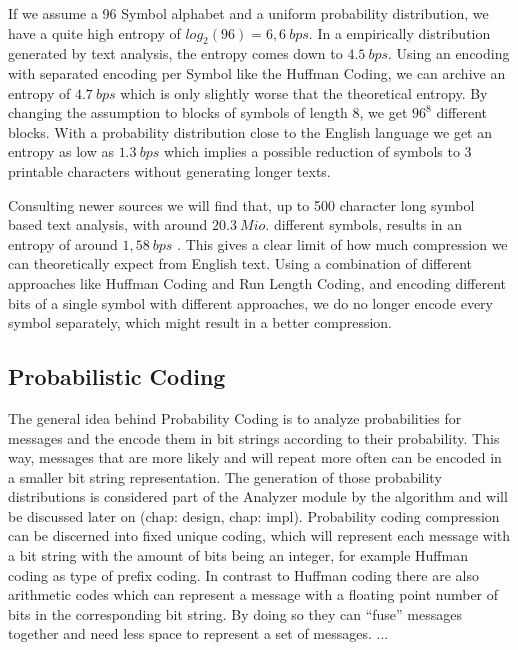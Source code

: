 \par {
If we assume a 96 Symbol alphabet and a uniform probability distribution, we have a quite high entropy of $log_2 (96) = 6,6 \: bps$. In a empirically distribution generated by text analysis, the entropy comes down to $4.5 \: bps$. Using an encoding with separated encoding per Symbol like the Huffman Coding, we can archive an entropy of $4.7 \: bps$ which is only slightly worse that the theoretical entropy. By changing the assumption to blocks of symbols of length 8, we get $96^8$ different blocks. With a probability distribution close to the English language we get an entropy as low as $1.3 \: bps$ which implies a possible reduction of symbols to 3 printable characters without generating longer texts.}

\par{
Consulting newer sources we will find that, up to 500 character long symbol based text analysis, with around $20.3 \: Mio.$ different symbols, results in an entropy of around $1,58 \: bps$ \cite{entropy-new}. This gives a clear limit of how much compression we can theoretically expect from English text.  Using a combination of different approaches like Huffman Coding and Run Length Coding, and encoding different bits of a single symbol with different approaches, we do no longer encode every symbol separately, which might result in a better compression.}


\subsection{Probabilistic Coding}
\par{
The general idea behind Probability Coding is to analyze probabilities for messages and the encode them in bit strings according to their probability. This way, messages that are more likely and will repeat more often can be encoded in a smaller bit string representation. The generation of those probability distributions is considered part of the Analyzer module by the algorithm and will be discussed later on (chap: design, chap: impl). Probability coding compression can be discerned into fixed unique coding, which will represent each message with a bit string with the amount of bits being an integer, for example Huffman coding as type of prefix coding. In contrast to Huffman coding there are also arithmetic codes which can represent a message with a floating point number of bits in the corresponding bit string. By doing so they can \enquote{fuse} messages together and need less space to represent a set of messages.
}
...


